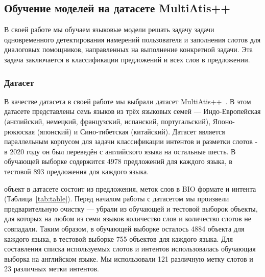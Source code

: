 \subsection{Обучение моделей на датасете MultiAtis++}
В своей работе мы обучаем языковые модели решать задачу задачи одновременного детектирования намерений пользователя и заполнения слотов для диалоговых помощников, направленных на выполнение конкретной задачи.
Эта задача заключается в классификации предложений и всех слов в предложении.

\subsubsection{Датасет}
В качестве датасета в своей работе мы выбрали датасет MultiAtis++~\cite{Xu2020EndtoEndSA}.
В этом датасете представлены семь языков из трёх языковых семей —
Индо-Европейская (английский, немецкий, французский, испанский, португальский), Японо-рюкюская (японский) и Сино-тибетская (китайский).
Датасет является параллельным корпусом для задачи классификации интентов и разметки слотов - в 2020 году он был переведён с английского языка на остальные шесть.
В обучающей выборке содержится 4978 предложений для каждого языка, в тестовой 893 предложения для каждого языка.

\begin{table}[H]
    \caption{Пример объекта из датасета MultiAtis++. На примере представлен объект на английском и немецком языке.}\label{tab:table}
\end{table}

 объект в датасете состоит из предложения, меток слов в BIO формате и интента (Таблица~\eqref{tab:table}).
Перед началом работы с датасетом мы произвели предварительную очистку —
убрали из обучающей и тестовой выборок объекты, для которых на любом из семи языков количество слов и количество слотов не совпадали.
Таким образом, в обучающей выборке осталось 4884 объекта для каждого языка, в тестовой выборке 755 объектов для каждого языка.
Для составления списка используемых слотов и интентов использовалась обучающая выборка на английском языке.
Мы использовали 121 различную метку слотов и 23 различных метки интентов.

